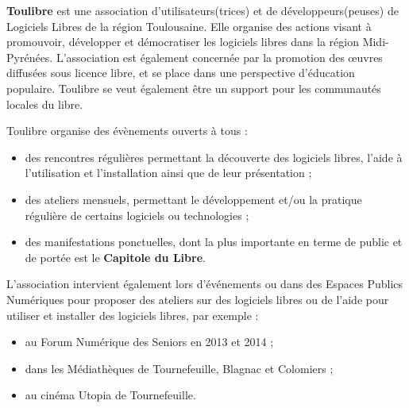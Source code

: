 
\textbf{Toulibre} est une association d'utilisateurs(trices) et de développeurs(peuses) de Logiciels Libres de la région Toulousaine. Elle organise des actions visant à promouvoir, développer et démocratiser les logiciels libres dans la région Midi-Pyrénées. L'association est également concernée par la promotion des œuvres diffusées sous licence libre, et se place dans une perspective d'éducation populaire. Toulibre se veut également être un support pour les communautés locales du libre.

\Separateur

Toulibre organise des évènements ouverts à tous :
\begin{itemize}[label=$\bullet$]
\item des rencontres régulières permettant la découverte des logiciels libres, l'aide à l'utilisation et l'installation ainsi que de leur présentation ;
\item des ateliers mensuels, permettant le développement et/ou la 
pratique régulière de certains logiciels ou technologies ;
\item des manifestations ponctuelles, dont la plus importante en terme 
de public et de portée est le \textbf{Capitole du Libre}.
\end{itemize}

L'association intervient également lors d'événements ou dans des Espaces Publics Numériques pour proposer des ateliers sur des logiciels libres ou de l'aide pour utiliser et installer des logiciels libres, par exemple :
\begin{itemize}[label=$\bullet$]
\item au Forum Numérique des Seniors en 2013 et 2014 ;
\item dans les Médiathèques de Tournefeuille, Blagnac et Colomiers ;
\item au cinéma Utopia de Tournefeuille.
\end{itemize}
